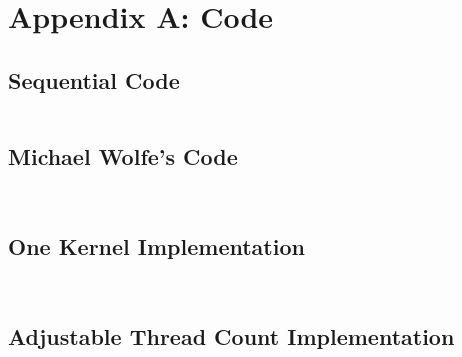 \documentclass[10pt]{article}
\begin{document}
\section{Appendix A: Code}

\subsection{Sequential Code}
\inputminted[linenos, fontsize=\footnotesize]{c}{../jacobi_final/seq_jacobi.c}

\subsection{Michael Wolfe's Code}
\inputminted[linenos, fontsize=\footnotesize]{c}{../jacobi_final/original_jacobi5.cu}
\inputminted[linenos, fontsize=\footnotesize]{c}{../jacobi_final/original_jacobi6.cu}

\subsection{One Kernel Implementation}
\inputminted[linenos, fontsize=\footnotesize]{c}{../jacobi_final/1k_jacobi5.cu}
\inputminted[linenos, fontsize=\footnotesize]{c}{../jacobi_final/1k_jacobi6.cu}

\subsection{Adjustable Thread Count Implementation}
\inputminted[linenos, fontsize=\footnotesize]{c}{../jacobi_final/orig_J6M_v2.cu}
\inputminted[linenos, fontsize=\footnotesize]{c}{../jacobi_final/1k_J6M_v2.cu}
\end{document}
